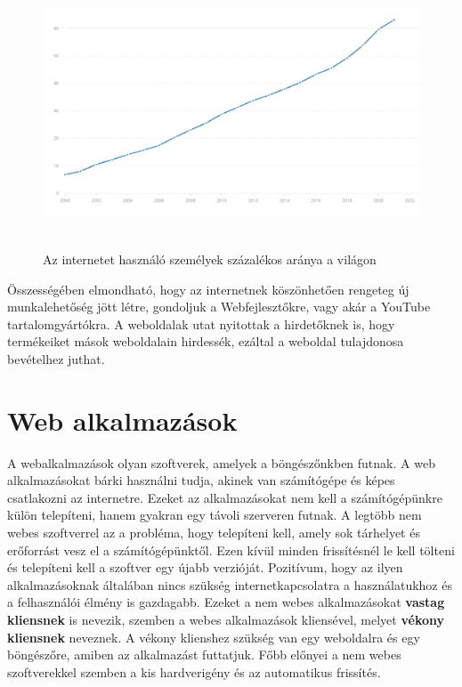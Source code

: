 \documentclass[
]{thesis-ekf}
\theoremstyle{definition}
\theoremstyle{remark}
\begin{document}
\begin{figure}[H]
	\centering
	\includegraphics[width=12cm, height=8cm]{internet}
	\caption{Az internetet használó személyek százalékos aránya a világon}
	\label{fig:picture}
\end{figure}

Összességében elmondható, hogy az internetnek köszönhetően rengeteg új munkalehetőség jött létre, gondoljuk a Webfejlesztőkre, vagy akár a YouTube tartalomgyártókra. A weboldalak utat nyitottak a hirdetőknek is, hogy termékeiket mások weboldalain hirdessék, ezáltal a weboldal tulajdonosa bevételhez juthat.

\section{Web alkalmazások}

A webalkalmazások olyan szoftverek, amelyek a böngészőnkben futnak. A web alkalmazásokat bárki használni tudja, akinek van számítógépe és képes csatlakozni az internetre. Ezeket az alkalmazásokat nem kell a számítógépünkre külön telepíteni, hanem gyakran egy távoli szerveren futnak. A legtöbb nem webes szoftverrel az a probléma, hogy telepíteni kell, amely sok tárhelyet és erőforrást vesz el a számítógépünktől. Ezen kívül minden frissítésnél le kell tölteni és telepíteni kell a szoftver egy újabb verzióját. Pozitívum, hogy az ilyen alkalmazásoknak általában nincs szükség internetkapcsolatra a használatukhoz és a felhasználói élmény is gazdagabb. Ezeket a nem webes alkalmazásokat \textbf{vastag kliensnek} is nevezik, szemben a webes alkalmazások kliensével, melyet \textbf{vékony kliensnek} neveznek. A vékony klienshez szükség van egy weboldalra és egy böngészőre, amiben az alkalmazást futtatjuk.
Főbb előnyei a nem webes szoftverekkel szemben a kis hardverigény és az automatikus frissítés.
\end{document}

